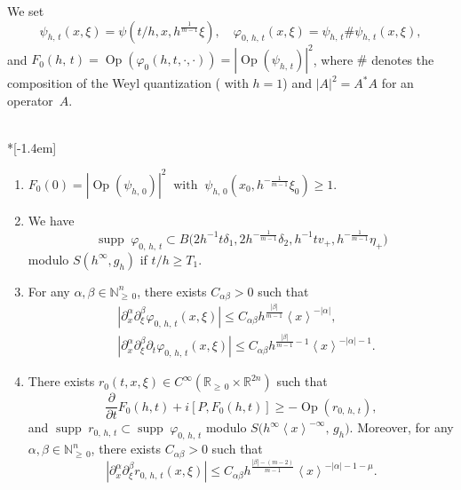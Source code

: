 \documentclass[AHL,Unicode,longabstracts,published]{cedram}
\renewcommand*\a{\alpha}
\renewcommand*\b{\beta}
\renewcommand*\d{\delta}
\newcommand*\f{\varphi}
\newcommand*\g{\psi}
\newcommand*\m{\mu}
\newcommand*\x{\xi}
\newcommand*\y{\eta}
\DeclareMathOperator{\Op}{Op}
\newcommand*\re{\mathbb{R}}
\newcommand{\bbN}{\mathbb{N}}
\newcommand*\pa{\partial}
\DeclareMathOperator{\supp}{supp\;}
\newcommand{\jap}[1]{\left\langle #1 \right\rangle}
\newcommand{\bigpare}[1]{\bigl(#1\bigr)}
\newcommand*{\romanenumi}{\renewcommand*{\theenumi}{\roman{enumi}}}
\begin{document}
We set
\begin{equation}\label{gdef}
\g_{h,\,t}(x,\x)= \g\left(t/h,x,h^{\frac{1}{m-1}}\x\right),\quad \f_{0,\,h,\,t}(x,\x)=\g_{h,\,t}\#\g_{h,\,t}(x,\x),
\end{equation}
and $F_0(h,\,t) =\Op(\f_0(h,t,\cdot, \cdot))=|\Op(\g_{h,\,t})|^2$, where $\#$ denotes the composition of the Weyl quantization (\cite[$(4.3.6)$]{Z} with $h=1$) and $|A|^2=A^*A$ for an operator~$A$.

\begin{lemm}\label{op}\ \\*[-1.4em]
\begin{enumerate}\romanenumi
\item \label{lemmB3.1}$F_0(0) =|\Op(\g_{h,\,0})|^2\;\; \text{with}\;\; \g_{h,\,0}(x_0,h^{-\frac{1}{m-1}}\x_0) \geq 1$.
\item \label{lemmB3.2}We have
\[
\supp \f_{0,\,h,\,t}\subset B\bigpare{2h^{-1}t\d_1,2h^{-\frac{1}{m-1}}\d_2,h^{-1}tv_+,h^{-\frac{1}{m-1}}\y_+}
\]
modulo $S(h^{\infty},g_h)$ if $t/h\geq T_1$.
\item \label{lemmB3.3}For any $\a,\b \in \bbN_{\geq\,0}^n$, there exists $C_{\a\b}>0$ such that
\begin{align*}
&\left|\pa_x^{\a}\pa_{\x}^{\b}\f_{0,\,h,\,t}(x,\x)\right|\leq C_{\a\b} h^{\frac{|\b|}{m-1}} \jap{x}^{-|\a|},\\
&\left|\pa_x^{\a}\pa_{\x}^{\b}\pa_t \f_{0,\,h,\,t}(x,\x)\right|\leq C_{\a\b} h^{\frac{|\b|}{m-1}-1} \jap{x}^{-|\a|-1}.
\end{align*}
\item \label{lemmB3.4}There exists $r_0(t,x,\x) \in C^{\infty} (\re_{\geq\,0} \times \re^{2n})$ such that
\[
\frac{\pa}{\pa t} F_0(h,t) + i[P, F_0(h,t)] \geq -\Op(r_{0,\,h,\,t}),
\]
and $\supp r_{0,\,h,\,t}\subset \supp \f_{0,\,h,\,t}$ modulo $S\bigpare{h^{\infty}\jap{x}^{-\infty},\,g_h}$. Moreover, for any $\a,\b \in \bbN_{\geq\,0}^n$, there exists $C_{\a\b}>0$ such that
\[
\left|\pa_x^{\a}\pa_{\x}^{\b}r_{0,\,h,\,t}(x,\x)\right|\leq C_{\a\b} h^{\frac{|\b|-(m-2)}{m-1}} \jap{x}^{-|\a|-1-\m}.
\]
\end{enumerate}

\end{lemm}
\end{document}
